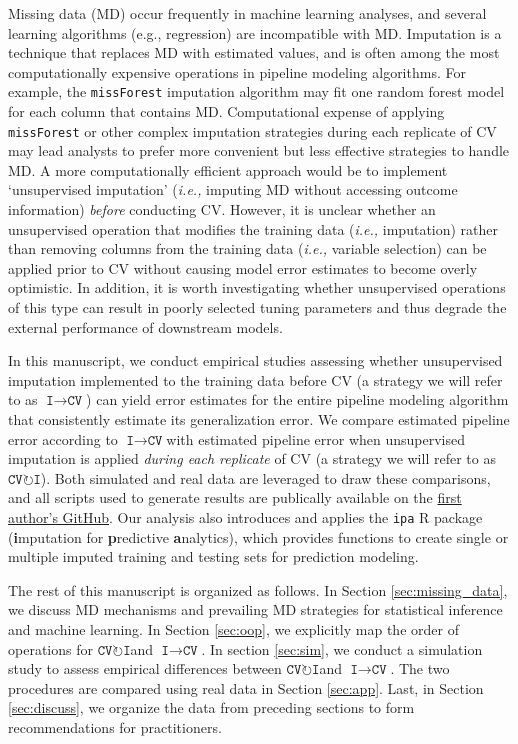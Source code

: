\documentclass[AMA,STIX1COL,doublespace]{WileyNJD-v2}
\begin{document}
Missing data (MD) occur frequently in machine learning analyses, and
several learning algorithms (e.g., regression) are incompatible with MD.
Imputation is a technique that replaces MD with estimated values, and is
often among the most computationally expensive operations in pipeline
modeling algorithms. For example, the \texttt{missForest} imputation
algorithm may fit one random forest model for each column that contains
MD. Computational expense of applying \texttt{missForest} or other
complex imputation strategies during each replicate of CV may lead
analysts to prefer more convenient but less effective strategies to
handle MD. A more computationally efficient approach would be to
implement `unsupervised imputation' (\textit{i.e., }imputing MD without
accessing outcome information) \emph{before} conducting CV. However, it
is unclear whether an unsupervised operation that modifies the training
data (\textit{i.e., }imputation) rather than removing columns from the
training data (\textit{i.e., }variable selection) can be applied prior
to CV without causing model error estimates to become overly optimistic.
In addition, it is worth investigating whether unsupervised operations
of this type can result in poorly selected tuning parameters and thus
degrade the external performance of downstream models.

In this manuscript, we conduct empirical studies assessing whether
unsupervised imputation implemented to the training data before CV (a
strategy we will refer to as $\texttt{I}\!\!\rightarrow\!\texttt{CV}$)
can yield error estimates for the entire pipeline modeling algorithm
that consistently estimate its generalization error. We compare
estimated pipeline error according to
$\texttt{I}\!\!\rightarrow\!\texttt{CV}$\space with estimated pipeline
error when unsupervised imputation is applied
\emph{during each replicate} of CV (a strategy we will refer to as
$\texttt{CV}\!\circlearrowright\!\texttt{I}$). Both simulated and real
data are leveraged to draw these comparisons, and all scripts used to
generate results are publically available on the
\href{https://github.com/bcjaeger/Imputation-and-CV}{first author's
GitHub}. Our analysis also introduces and applies the \texttt{ipa} R
package (\textbf{i}mputation for \textbf{p}redictive
\textbf{a}nalytics), which provides functions to create single or
multiple imputed training and testing sets for prediction modeling.

The rest of this manuscript is organized as follows. In Section
\ref{sec:missing_data}, we discuss MD mechanisms and prevailing MD
strategies for statistical inference and machine learning. In Section
\ref{sec:oop}, we explicitly map the order of operations for
$\texttt{CV}\!\circlearrowright\!\texttt{I}$\space and
$\texttt{I}\!\!\rightarrow\!\texttt{CV}$. In section \ref{sec:sim}, we
conduct a simulation study to assess empirical differences between
$\texttt{CV}\!\circlearrowright\!\texttt{I}$\space and
$\texttt{I}\!\!\rightarrow\!\texttt{CV}$. The two procedures are
compared using real data in Section \ref{sec:app}. Last, in Section
\ref{sec:discuss}, we organize the data from preceding sections to form
recommendations for practitioners.
\end{document}
